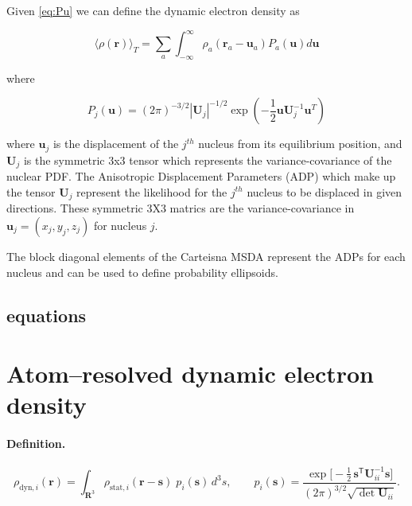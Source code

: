 \documentclass{standalone}
\begin{document}
Given \eqref{eq:Pu} we can define the dynamic electron density as

\begin{equation}
\label{eq:dynTrho}
\langle \rho(\mathbf{r}) \rangle_T = \sum_a \int_{-\infty}^{\infty} \rho_a(\mathbf{r}_a - \mathbf{u}_a) P_a(\mathbf{u}) d\mathbf{u}
\end{equation}

where

\begin{equation}
\label{eq:Pa}
    P_j(\mathbf{u}) = (2\pi)^{-3/2} |\mathbf{U}_j|^{-1/2} \exp\left(-\frac{1}{2} \mathbf{u} \mathbf{U}_j^{-1} \mathbf{u}^T\right)
\end{equation}

where $\mathbf{u}_j$ is the displacement of the $j^{th}$ nucleus from its equilibrium position, and $\mathbf{U}_j$ is the
symmetric 3x3 tensor which represents the variance-covariance of the nuclear PDF. The Anisotropic Displacement Parameters (ADP)
which make up the tensor $\mathbf{U}_j$ represent the likelihood for the $j^{th}$ nucleus to be displaced in given directions.
These symmetric 3X3 matrics are the variance-covariance in $\mathbf{u}_j = (x_j, y_j, z_j)$ for nucleus $j$.

The block diagonal elements of the Carteisna MSDA represent the ADPs for each nucleus and can be used to define probability
ellipsoids.

\subsection{equations}

\newcommand{\RR}{\mathbf R}          %
\newcommand{\rvec}{\mathbf r}
\newcommand{\svec}{\mathbf s}
\newcommand{\A}{\mathbf A}
\newcommand{\B}{\mathbf B}
\newcommand{\Cvec}{\mathbf C}
\newcommand{\Uii}{\mathbf U_{ii}}
\newcommand{\Uij}{\mathbf U_{ij}}
\newcommand{\Sig}{\boldsymbol\Sigma_{ij}}
\newcommand{\Lam}{\boldsymbol\Lambda_{ij}}
\newcommand{\alphaa}{\alpha}         %
\newcommand{\betab}{\beta}           %
\newcommand{\gammaab}{\gamma}        %
\newcommand{\poly}{\mathcal P_{\mu\nu}}

\section*{Atom–resolved dynamic electron density}

\paragraph{Definition.}
\[
\rho_{\mathrm{dyn},i}(\rvec)=
\int_{\RR^{3}}
\rho_{\mathrm{stat},i}(\rvec-\svec)\;
p_i(\svec)\,d^{3}\!s,
\qquad
p_i(\svec)=
\frac{\exp\!\bigl[-\tfrac12\,\svec^{\mathsf T}\Uii^{-1}\svec\bigr]}
     {(2\pi)^{3/2}\sqrt{\det\Uii}} .
\tag{1}
\]
\end{document}
